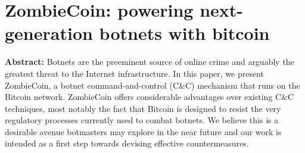 \section{ZombieCoin: powering next-generation botnets with bitcoin}

\textbf{Abstract:} 
Botnets are the preeminent source of online crime and arguably the greatest threat to the Internet infrastructure.
In this paper, we present ZombieCoin, a botnet command-and-control (C\&C) mechanism that runs on the Bitcoin network. 
ZombieCoin offers considerable advantages over existing C\&C techniques, most notably the fact that Bitcoin is designed to resist the very regulatory processes currently used to combat botnets. We believe this is a desirable avenue botmasters may explore in the near future and our work is intended as a first step towards devising effective countermeasures.
